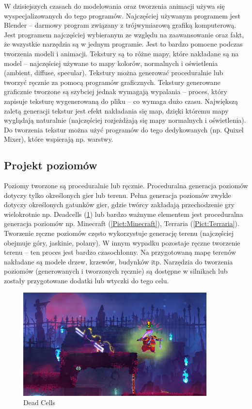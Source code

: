 \documentclass[12pt,twoside]{article}
\begin{document}
W dzisiejszych czasach do modelowania oraz tworzenia animacji używa się
wyspecjalizowanych do tego programów. Najczęściej używanym programem jest
Blender\cite{blender_URL} -- darmowy program związany z trójwymiarową grafiką komputerową. Jest
programem najczęściej wybieranym ze względu na zaawansowanie oraz fakt, że
wszystkie narzędzia są w jednym programie. Jest to bardzo pomocne podczas
tworzenia modeli i animacji.  
Tekstury są to różne mapy, które nakładane są na model --  najczęściej używane to
mapy kolorów, normalnych i oświetlenia (ambient, diffuse, specular). Tekstury
można generować proceduralnie lub tworzyć ręcznie za pomocą programów
graficznych. Tekstury generowane graficznie tworzone są szybciej jednak wymagają
wypalania -- proces, który zapisuje teksturę wygenerowaną do pliku --  co wymaga
dużo czasu. Największą zaletą generacji tekstur jest efekt nakładania się map,
dzięki któremu mapy wyglądają naturalnie (najczęściej rozjeżdżają się mapy
normalnych i oświetlenia).  Do tworzenia tekstur można użyć programów do tego
dedykowanych (np. Quixel Mixer), które wspierają np. warstwy.
\subsection{Projekt poziomów}

Poziomy tworzone są proceduralnie lub ręcznie. Proceduralna generacja poziomów
dotyczy tylko określonych gier lub terenu. Pełna generacja poziomów zwykle
dotyczy określonych gatunków gier, gdzie twórcy zakładają przechodzenie gry
wielokrotnie np. Deadcells (\ref{Pict:Dead Cells}) lub bardzo ważnyme elementem
jest proceduralna generacja poziomów np. Minecraft (\ref{Pict:Minecraft}),
Terraria (\ref{Pict:Terraria}). Tworzenie ręczne poziomów często wykorzystuje
generację terenu (najczęściej obejmuje góry, jaskinie, polany). W innym wypadku
pozostaje ręczne tworzenie terenu -- ten proces jest bardzo czasochłonny. Na
przygotowaną mapę terenów nakładane są modele drzew, krzewów, budynków itp.
Narzędzia do tworzenia poziomów (generowanych i tworzonych ręcznie) są dostępne
w silnikach lub zostały przygotowane dodatki lub wtyczki do tego celu.
\begin{figure}[ht!]
	\centering
	\includegraphics[width=10cm]{GamePictures/DeadCells.jpg}
	\caption{Dead Cells}
    \label{Pict:Dead Cells}
\end{figure}
\end{document}
